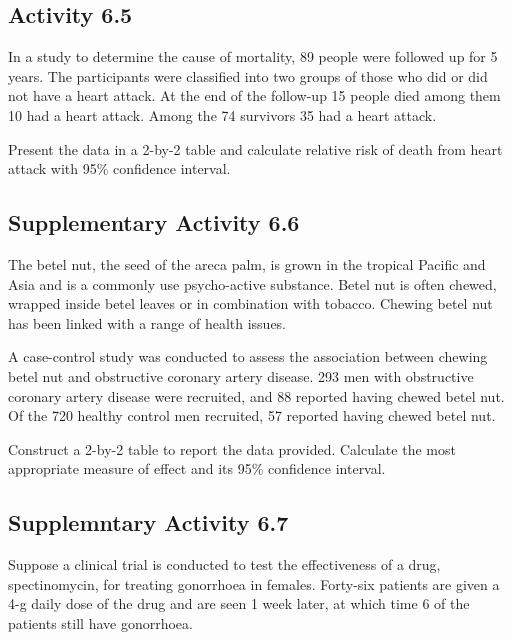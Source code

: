 \documentclass[
  a4paper,
]{memoir}
\begin{document}
\subsection*{Activity 6.5}\label{activity-6.5}

In a study to determine the cause of mortality, 89 people were followed
up for 5 years. The participants were classified into two groups of
those who did or did not have a heart attack. At the end of the
follow-up 15 people died among them 10 had a heart attack. Among the 74
survivors 35 had a heart attack.

Present the data in a 2-by-2 table and calculate relative risk of death
from heart attack with 95\% confidence interval.

\subsection*{Supplementary Activity
6.6}\label{supplementary-activity-6.6}

The betel nut, the seed of the areca palm, is grown in the tropical
Pacific and Asia and is a commonly use psycho-active substance. Betel
nut is often chewed, wrapped inside betel leaves or in combination with
tobacco. Chewing betel nut has been linked with a range of health
issues.

A case-control study was conducted to assess the association between
chewing betel nut and obstructive coronary artery disease. 293 men with
obstructive coronary artery disease were recruited, and 88 reported
having chewed betel nut. Of the 720 healthy control men recruited, 57
reported having chewed betel nut.

Construct a 2-by-2 table to report the data provided. Calculate the most
appropriate measure of effect and its 95\% confidence interval.

\subsection*{Supplemntary Activity 6.7}\label{supplemntary-activity-6.7}

Suppose a clinical trial is conducted to test the effectiveness of a
drug, spectinomycin, for treating gonorrhoea in females. Forty-six
patients are given a 4-g daily dose of the drug and are seen 1 week
later, at which time 6 of the patients still have gonorrhoea.
\end{document}
